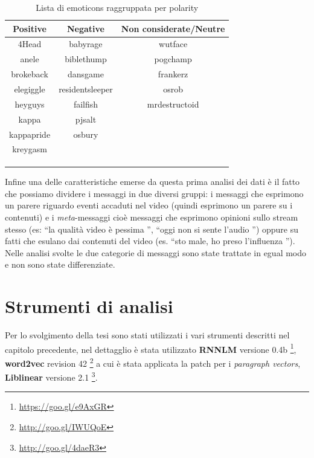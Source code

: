 \documentclass[a4paper,12pt,openright,twoside]{report}
\theoremstyle{definition}
\begin{document}
\begin{table}[H]
\begin{center}
\begin{tabular}{|c|c|c|}
\hline
Positive & Negative & Non considerate/Neutre \\
\hline
4Head & babyrage & wutface \\
\hline
anele &  biblethump &  pogchamp \\
\hline
brokeback &  dansgame & frankerz \\
\hline
elegiggle & residentsleeper &  osrob \\
\hline
heyguys & failfish & mrdestructoid \\
\hline
kappa & pjsalt & \\
\hline
kappapride & osbury & \\
\hline
kreygasm &  & \\
\hline
 & & \\
\hline
& & \\
\hline
& & \\
\hline
\end{tabular}
\end{center}
\caption{Lista di emoticons raggruppata per polarity}
\label{tab:emoticons2}
\end{table}

Infine una delle caratteristiche emerse da questa prima analisi dei dati è il fatto che possiamo dividere i messaggi in due diversi gruppi: i messaggi che esprimono un parere
riguardo eventi accaduti nel video (quindi esprimono un parere su i contenuti) e i \emph{meta}-messaggi cioè messaggi che esprimono opinioni sullo stream stesso (es: ``la qualità video
è pessima '', ``oggi non si sente l'audio '') oppure su fatti che esulano dai contenuti del video (es. ``sto male, ho preso l'influenza ''). Nelle analisi svolte le due categorie
di messaggi sono state trattate in egual modo e non sono state differenziate.
  
\section{Strumenti di analisi}
Per lo svolgimento della tesi sono stati utilizzati i vari strumenti descritti nel capitolo precedente,
nel dettagglio è stata utilizzato \textbf{RNNLM} versione 0.4b \footnote{\url{https://goo.gl/e9AxGR}}, 
\textbf{word2vec} revision 42 \footnote{\url{http://goo.gl/IWUQoE}}
a cui è stata applicata la patch per i \emph{paragraph vectors}, \textbf{Liblinear} versione 2.1 \footnote{\url{http://goo.gl/4daeR3}}.
\end{document}
